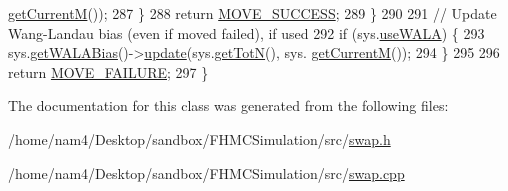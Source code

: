 \begin{DoxyCode}
      \hyperlink{classsim_system_a299fe4372e610b554eaaf5f5957b2dbc}{getCurrentM}());
287         \}
288         \textcolor{keywordflow}{return} \hyperlink{moves_8h_ae8285cbddc5d21f73f49dcbad82a775a}{MOVE\_SUCCESS};
289     \}
290 
291     \textcolor{comment}{// Update Wang-Landau bias (even if moved failed), if used}
292     \textcolor{keywordflow}{if} (sys.\hyperlink{classsim_system_aa83b00006b3919fb6e13f1bdeadece6a}{useWALA}) \{
293         sys.\hyperlink{classsim_system_a7cb5049de8b0988349e89e30e4000407}{getWALABias}()->\hyperlink{classwala_ab439e3f60bea6c54522a870b9ad67acf}{update}(sys.\hyperlink{classsim_system_a37dd827f4057049763351510147b9f1d}{getTotN}(), sys.
      \hyperlink{classsim_system_a299fe4372e610b554eaaf5f5957b2dbc}{getCurrentM}());
294     \}
295 
296     \textcolor{keywordflow}{return} \hyperlink{moves_8h_a9832cf5fcfa8c0894545b591c9908e39}{MOVE\_FAILURE};
297 \}
\end{DoxyCode}


The documentation for this class was generated from the following files\-:\begin{DoxyCompactItemize}
\item 
/home/nam4/\-Desktop/sandbox/\-F\-H\-M\-C\-Simulation/src/\hyperlink{swap_8h}{swap.\-h}\item 
/home/nam4/\-Desktop/sandbox/\-F\-H\-M\-C\-Simulation/src/\hyperlink{swap_8cpp}{swap.\-cpp}\end{DoxyCompactItemize}
